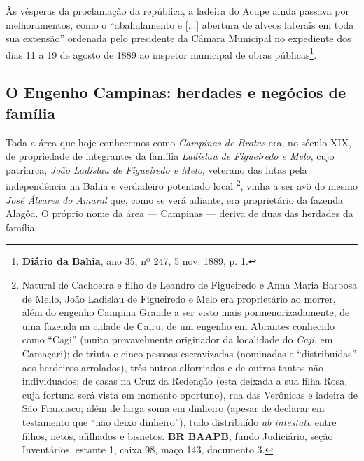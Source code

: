Às vésperas da proclamação da república, a ladeira do Acupe ainda passava por melhoramentos, como o ``abahulamento e [...] abertura de alveos laterais em toda sua extensão'' ordenada pelo presidente da Câmara Municipal no expediente dos dias 11 a 19 de agosto de 1889 ao inspetor municipal de obras públicas\footnote{\textbf{Diário da Bahia}, ano 35, nº 247, 5 nov. 1889, p. 1.}.

\subsection{O Engenho Campinas: herdades e negócios de família}\label{subsec:campinasladislau}

Toda a área que hoje conhecemos como \textit{Campinas de Brotas} era, no século XIX, de propriedade de integrantes da família \textit{Ladislau de Figueiredo e Melo}, cujo patriarca, \textit{João Ladislau de Figueiredo e Melo}, veterano das lutas pela independência na Bahia e verdadeiro potentado local \cite[p.~59]{REISSILVA1989}\footnote{Natural de Cachoeira e filho de Leandro de Figueiredo e Anna Maria Barbosa de Mello, João Ladislau de Figueiredo e Melo era proprietário ao morrer, além do engenho Campina Grande a ser visto mais pormenorizadamente, de uma fazenda na cidade de Cairu; de um engenho em Abrantes conhecido como ``Cagi'' (muito provavelmente originador da localidade do \textit{Caji}, em Camaçari); de trinta e cinco pessoas escravizadas (nominadas e ``distribuídas'' aos herdeiros arrolados), três outros alforriados e de outros tantos não individuados; de casas na Cruz da Redenção (esta deixada a sua filha Rosa, cuja fortuna será vista em momento oportuno), rua das Verônicas e ladeira de São Francisco; além de larga soma em dinheiro (apesar de declarar em testamento que ``não deixo dinheiro''), tudo distribuído \textit{ab intestato} entre filhos, netos, afilhados e bisnetos. \textbf{BR BAAPB}, fundo Judiciário, seção Inventários, estante 1, caixa 98, maço 143, documento 3.}, vinha a ser avô do mesmo \textit{José Álvares do Amaral} que, como se verá adiante, era proprietário da fazenda Alagôa. O próprio nome da área --- Campinas --- deriva de duas das herdades da família.

